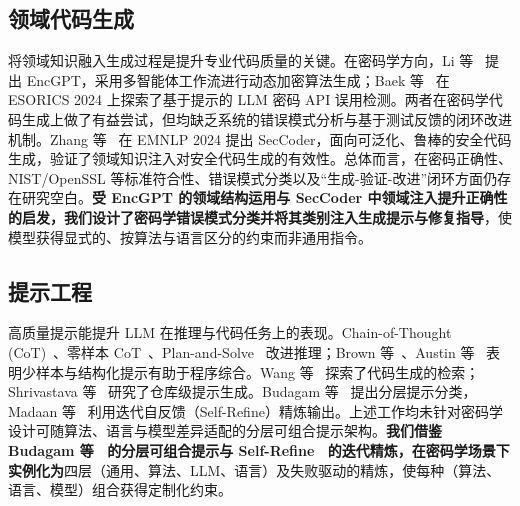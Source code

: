 \documentclass[12pt]{llncs}
\begin{document}
\subsection{领域代码生成}
将领域知识融入生成过程是提升专业代码质量的关键。在密码学方向，Li 等~\cite{encgpt} 提出 EncGPT，采用多智能体工作流进行动态加密算法生成；Baek 等~\cite{cryptollm} 在 ESORICS 2024 上探索了基于提示的 LLM 密码 API 误用检测。两者在密码学代码生成上做了有益尝试，但均缺乏系统的错误模式分析与基于测试反馈的闭环改进机制。Zhang 等~\cite{seccoder} 在 EMNLP 2024 提出 SecCoder，面向可泛化、鲁棒的安全代码生成，验证了领域知识注入对安全代码生成的有效性。总体而言，在密码正确性、NIST/OpenSSL 等标准符合性、错误模式分类以及“生成-验证-改进”闭环方面仍存在研究空白。\textbf{受 EncGPT 的领域结构运用与 SecCoder 中领域注入提升正确性的启发，我们设计了密码学错误模式分类并将其类别注入生成提示与修复指导}，使模型获得显式的、按算法与语言区分的约束而非通用指令。

\subsection{提示工程}
高质量提示能提升 LLM 在推理与代码任务上的表现。Chain-of-Thought (CoT)~\cite{cot}、零样本 CoT~\cite{zeroshotcot}、Plan-and-Solve~\cite{planandsolve} 改进推理；Brown 等~\cite{fewshot}、Austin 等~\cite{progsynprompt} 表明少样本与结构化提示有助于程序综合。Wang 等~\cite{coderagbench} 探索了代码生成的检索；Shrivastava 等~\cite{repolevelprompt} 研究了仓库级提示生成。Budagam 等~\cite{hierprompt} 提出分层提示分类，Madaan 等~\cite{selfrefine} 利用迭代自反馈（Self-Refine）精炼输出。上述工作均未针对密码学设计可随算法、语言与模型差异适配的分层可组合提示架构。\textbf{我们借鉴 Budagam 等~\cite{hierprompt} 的分层可组合提示与 Self-Refine~\cite{selfrefine} 的迭代精炼，在密码学场景下实例化为}四层（通用、算法、LLM、语言）及失败驱动的精炼，使每种（算法、语言、模型）组合获得定制化约束。
\end{document}

